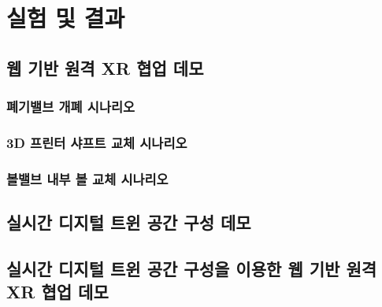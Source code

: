 
\section{실험 및 결과}
\subsection{웹 기반 원격 XR 협업 데모}
\subsubsection{폐기밸브 개폐 시나리오}
\subsubsection{3D 프린터 샤프트 교체 시나리오}
\subsubsection{볼밸브 내부 볼 교체 시나리오}

\subsection{실시간 디지털 트윈 공간 구성 데모}

\subsection{실시간 디지털 트윈 공간 구성을 이용한 웹 기반 원격 XR 협업 데모}